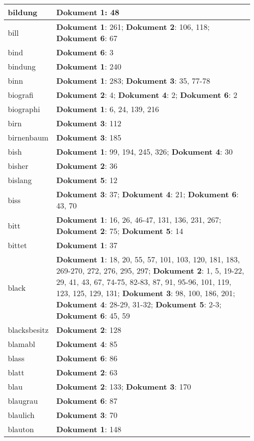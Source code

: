 \documentclass[a5paper]{article}
\begin{document}
\begin{longtable}[l]{|l|p{3in}|}
\hline
bildung & \textbf{Dokument 1}: 48 \\
\hline
bill & \textbf{Dokument 1}: 261; \textbf{Dokument 2}: 106, 118; \textbf{Dokument 6}: 67 \\
\hline
bind & \textbf{Dokument 6}: 3 \\
\hline
bindung & \textbf{Dokument 1}: 240 \\
\hline
binn & \textbf{Dokument 1}: 283; \textbf{Dokument 3}: 35, 77-78 \\
\hline
biografi & \textbf{Dokument 2}: 4; \textbf{Dokument 4}: 2; \textbf{Dokument 6}: 2 \\
\hline
biographi & \textbf{Dokument 1}: 6, 24, 139, 216 \\
\hline
birn & \textbf{Dokument 3}: 112 \\
\hline
birnenbaum & \textbf{Dokument 3}: 185 \\
\hline
bish & \textbf{Dokument 1}: 99, 194, 245, 326; \textbf{Dokument 4}: 30 \\
\hline
bisher & \textbf{Dokument 2}: 36 \\
\hline
bislang & \textbf{Dokument 5}: 12 \\
\hline
biss & \textbf{Dokument 3}: 37; \textbf{Dokument 4}: 21; \textbf{Dokument 6}: 43, 70 \\
\hline
bitt & \textbf{Dokument 1}: 16, 26, 46-47, 131, 136, 231, 267; \textbf{Dokument 2}: 75; \textbf{Dokument 5}: 14 \\
\hline
bittet & \textbf{Dokument 1}: 37 \\
\hline
black & \textbf{Dokument 1}: 18, 20, 55, 57, 101, 103, 120, 181, 183, 269-270, 272, 276, 295, 297; \textbf{Dokument 2}: 1, 5, 19-22, 29, 41, 43, 67, 74-75, 82-83, 87, 91, 95-96, 101, 119, 123, 125, 129, 131; \textbf{Dokument 3}: 98, 100, 186, 201; \textbf{Dokument 4}: 28-29, 31-32; \textbf{Dokument 5}: 2-3; \textbf{Dokument 6}: 45, 59 \\
\hline
blacksbesitz & \textbf{Dokument 2}: 128 \\
\hline
blamabl & \textbf{Dokument 4}: 85 \\
\hline
blass & \textbf{Dokument 6}: 86 \\
\hline
blatt & \textbf{Dokument 2}: 63 \\
\hline
blau & \textbf{Dokument 2}: 133; \textbf{Dokument 3}: 170 \\
\hline
blaugrau & \textbf{Dokument 6}: 87 \\
\hline
blaulich & \textbf{Dokument 3}: 70 \\
\hline
blauton & \textbf{Dokument 1}: 148 \\

\end{longtable}
\end{document}
